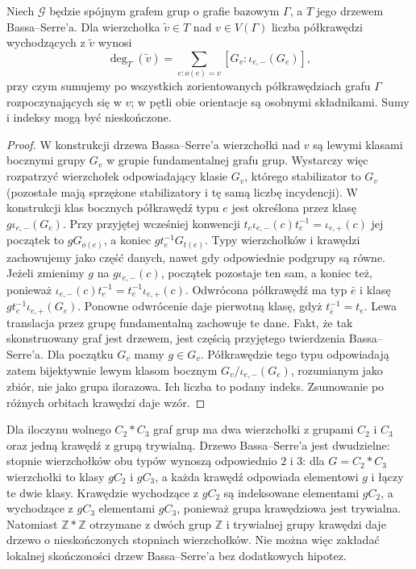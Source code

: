 \begin{stwierdzenie}
Niech $\mathcal G$ będzie spójnym grafem grup o grafie bazowym
$\Gamma$, a $T$ jego drzewem Bassa--Serre'a. Dla
wierzchołka $\widetilde v\in T$ nad $v\in V(\Gamma)$
liczba półkrawędzi wychodzących z $\widetilde v$ wynosi
\[
\deg_T(\widetilde v)=
\sum_{e\colon o(e)=v}[G_v:\iota_{e,-}(G_e)],
\]
przy czym sumujemy po wszystkich zorientowanych
półkrawędziach grafu $\Gamma$ rozpoczynających się w $v$;
w pętli obie orientacje są osobnymi składnikami.
Sumy i indeksy mogą być nieskończone.
\end{stwierdzenie}
\begin{proof}
W konstrukcji drzewa Bassa--Serre'a wierzchołki nad $v$
są lewymi klasami bocznymi grupy $G_v$ w grupie
fundamentalnej grafu grup. Wystarczy więc rozpatrzyć
wierzchołek odpowiadający klasie $G_v$, którego
stabilizator to $G_v$ (pozostałe mają sprzężone
stabilizatory i tę samą liczbę incydencji).
W konstrukcji klas bocznych półkrawędź typu $e$
jest określona przez klasę $g\iota_{e,-}(G_e)$.
Przy przyjętej wcześniej konwencji
$t_e\iota_{e,-}(c)t_e^{-1}=\iota_{e,+}(c)$
jej początek to $gG_{o(e)}$, a koniec
$gt_e^{-1}G_{t(e)}$. Typy wierzchołków i krawędzi
zachowujemy jako część danych, nawet gdy
odpowiednie podgrupy są równe.
Jeżeli zmienimy $g$ na $g\iota_{e,-}(c)$,
początek pozostaje ten sam, a koniec też,
ponieważ $\iota_{e,-}(c)t_e^{-1}
=t_e^{-1}\iota_{e,+}(c)$. Odwrócona półkrawędź
ma typ $\bar e$ i klasę
$gt_e^{-1}\iota_{e,+}(G_e)$.
Ponowne odwrócenie daje pierwotną klasę,
gdyż $t_{\bar e}^{-1}=t_e$. Lewa translacja
przez grupę fundamentalną zachowuje te dane.
Fakt, że tak skonstruowany graf jest drzewem,
jest częścią przyjętego twierdzenia Bassa--Serre'a.
Dla początku $G_v$
mamy $g\in G_v$. Półkrawędzie tego typu odpowiadają
zatem bijektywnie lewym klasom bocznym
$G_v/\iota_{e,-}(G_e)$, rozumianym jako zbiór,
nie jako grupa ilorazowa. Ich liczba to podany indeks.
Zsumowanie po różnych orbitach krawędzi daje wzór.
\end{proof}
\begin{przyklad}
Dla iloczynu wolnego $C_2*C_3$ graf grup ma dwa wierzchołki
z grupami $C_2$ i $C_3$ oraz jedną krawędź z grupą trywialną.
Drzewo Bassa--Serre'a jest dwudzielne: stopnie wierzchołków
obu typów wynoszą odpowiednio $2$ i $3$:
dla $G=C_2*C_3$ wierzchołki to klasy $gC_2$
i $gC_3$, a każda krawędź odpowiada elementowi $g$
i łączy te dwie klasy. Krawędzie wychodzące
z $gC_2$ są indeksowane elementami $gC_2$,
a wychodzące z $gC_3$ elementami $gC_3$,
ponieważ grupa krawędziowa jest trywialna.
Natomiast
$\mathbb Z*\mathbb Z$ otrzymane z dwóch grup $\mathbb Z$
i trywialnej grupy krawędzi daje drzewo o nieskończonych
stopniach wierzchołków. Nie można więc zakładać lokalnej
skończoności drzew Bassa--Serre'a bez dodatkowych hipotez.
\end{przyklad}

